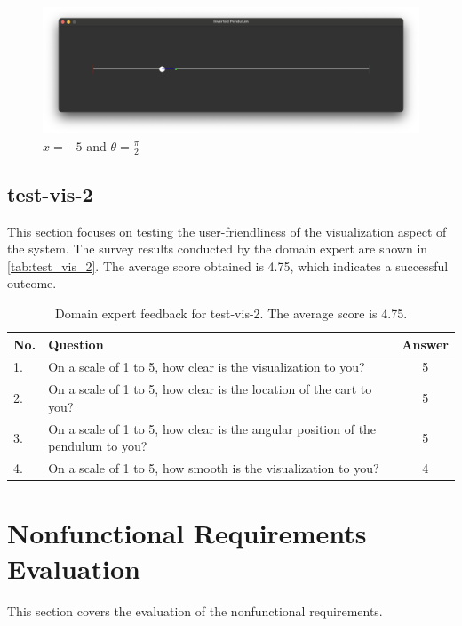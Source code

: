 \documentclass[12pt, titlepage]{article}
\begin{document}
\begin{figure}[h!]
  \begin{center}
    \includegraphics[width=\textwidth]{test_vis_1_4.png}
  \end{center}
  \caption{$x=-5$ and $\theta=\frac{\pi}{2}$}
  \label{fig:test_vis_1_4}
\end{figure}

\newpage

\subsection{test-vis-2}
This section focuses on testing the user-friendliness of the visualization aspect of the system. 
The survey results conducted by the domain expert are shown in \autoref{tab:test_vis_2}. 
The average score obtained is 4.75, which indicates a successful outcome.

\begin{table}[!h]
  \centering
  \caption{Domain expert feedback for test-vis-2. The average score is 4.75.}
  \label{tab:test_vis_2}
  \begin{tabular}{ p{0.5cm}|p{12cm}|c}
    \hline
    No. & Question                                                                        & Answer \\
    \hline
    1.  & On a scale of 1 to 5, how clear is the visualization to you?                    & 5      \\
    2.  & On a scale of 1 to 5, how clear is the location of the cart to you?             & 5      \\
    3.  & On a scale of 1 to 5, how clear is the angular position of the pendulum to you? & 5      \\
    4.  & On a scale of 1 to 5, how smooth is the visualization to you?                   & 4      \\
    \hline
  \end{tabular}
\end{table}

\section{Nonfunctional Requirements Evaluation}
This section covers the evaluation of the nonfunctional requirements.
\end{document}
